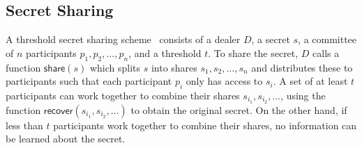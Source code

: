 \subsection{Secret Sharing}
A threshold secret sharing scheme~\cite{shamir_ss} consists of a dealer $D$, a secret $s$, a committee of $n$ participants $p_1, p_2, \dots, p_n$, and a threshold $t$.
To share the secret, $D$ calls a function $\textsf{share}(s)$ which splits $s$ into shares $s_1, s_2, \dots, s_n$ and distributes these to participants such that each participant $p_i$ only has access to $s_i$.
A set of at least $t$ participants can work together to combine their shares $s_{i_1}, s_{i_2}, \dots$, using the function $\textsf{recover}(s_{i_1}, s_{i_2}, \dots)$ to obtain the original secret.
On the other hand, if less than $t$ participants work together to combine their shares, no information can be learned about the secret.